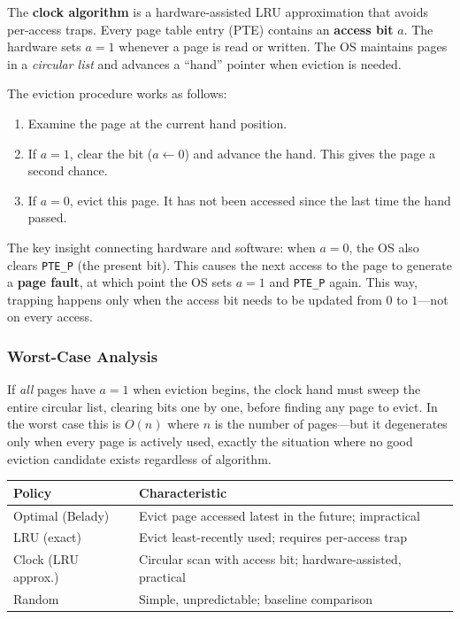 \documentclass[11pt]{article}
\begin{document}
The \textbf{clock algorithm} is a hardware-assisted LRU approximation that avoids per-access traps. Every page table entry (PTE) contains an \textbf{access bit} $a$. The hardware sets $a = 1$ whenever a page is read or written. The OS maintains pages in a \emph{circular list} and advances a ``hand'' pointer when eviction is needed.

The eviction procedure works as follows:
\begin{enumerate}
    \item Examine the page at the current hand position.
    \item If $a = 1$, clear the bit ($a \leftarrow 0$) and advance the hand. This gives the page a second chance.
    \item If $a = 0$, evict this page. It has not been accessed since the last time the hand passed.
\end{enumerate}

The key insight connecting hardware and software: when $a = 0$, the OS also clears \texttt{PTE\_P} (the present bit). This causes the next access to the page to generate a \textbf{page fault}, at which point the OS sets $a = 1$ and \texttt{PTE\_P} again. This way, trapping happens only when the access bit needs to be updated from $0$ to $1$---not on every access.

\subsubsection*{Worst-Case Analysis}

If \emph{all} pages have $a = 1$ when eviction begins, the clock hand must sweep the entire circular list, clearing bits one by one, before finding any page to evict. In the worst case this is $O(n)$ where $n$ is the number of pages---but it degenerates only when every page is actively used, exactly the situation where no good eviction candidate exists regardless of algorithm.

\begin{center}
\begin{tabular}{ll}
\toprule
\textbf{Policy} & \textbf{Characteristic} \\
\midrule
Optimal (Belady) & Evict page accessed latest in the future; impractical \\
LRU (exact) & Evict least-recently used; requires per-access trap \\
Clock (LRU approx.) & Circular scan with access bit; hardware-assisted, practical \\
Random & Simple, unpredictable; baseline comparison \\
\bottomrule
\end{tabular}
\end{center}
\end{document}

